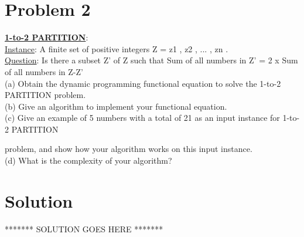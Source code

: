 
\section*{Problem 2}
    \textbf{\underline{1-to-2 PARTITION}}:\\
    \underline{Instance}: A finite set of positive integers Z = { z1 , z2 , ... , zn }.\\
    \underline{Question}: Is there a subset Z' of Z such that
    Sum of all numbers in Z' = 2 x Sum of all numbers in Z-Z'\\
    
    \noindent
    (a) Obtain the dynamic programming functional equation to solve the 1-to-2 PARTITION problem.\\
    (b) Give an algorithm to implement your functional equation.\\
    (c) Give an example of 5 numbers with a total of 21 as an input instance for 1-to-2 PARTITION
    
     problem, and show how your algorithm works on this input instance.\\
    (d) What is the complexity of your algorithm?\\

\section*{Solution}
******* SOLUTION GOES HERE *******